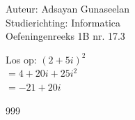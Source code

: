 \documentclass[a4paper]{article}
\begin{document}
\noindent \large Auteur: Adsayan Gunaseelan \\
\noindent \large Studierichting: Informatica\\
\noindent \large Oefeningenreeks 1B nr. 17.3\\

\medskip

\normalsize


 Los op:  $(2+5i)^2$\\

$= 4 +20i +25i^2$\\

$= -21 +20i$\\


\begin{thebibliography}{999}
\end{thebibliography}
\end{document}
